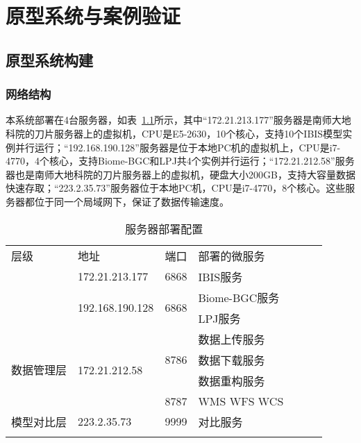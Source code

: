 \chapter{原型系统与案例验证}

\section{原型系统构建}
\subsection{网络结构}
本系统部署在4台服务器，如表~\ref{tab:server-cfg}所示，其中“172.21.213.177”服务器是南师大地科院的刀片服务器上的虚拟机，CPU是E5-2630，10个核心，支持10个IBIS模型实例并行运行；“192.168.190.128”服务器是位于本地PC机的虚拟机上，CPU是i7-4770，4个核心，支持Biome-BGC和LPJ共4个实例并行运行；“172.21.212.58”服务器也是南师大地科院的刀片服务器上的虚拟机，硬盘大小200GB，支持大容量数据快速存取；“223.2.35.73”服务器位于本地PC机，CPU是i7-4770，8个核心。这些服务器都位于同一个局域网下，保证了数据传输速度。

\begin{table}[H]
    \centering
    \caption{服务器部署配置}
    \label{tab:server-cfg}
    \begin{threeparttable}
        \begin{tabular}{lllllll}
            \Xhline{1.5pt}
            层级 & 地址 & 端口 & 部署的微服务 \\
            \Xhline{1pt}
            \multirow{3}{*}{模型计算层} & 172.21.213.177 & 6868 & IBIS服务 \\
            & \multirow{2}{*}{192.168.190.128} & \multirow{2}{*}{6868} & Biome-BGC服务 \\
            &&& LPJ服务 \\
            \hline
            \multirow{4}{*}{数据管理层} & \multirow{4}{*}{172.21.212.58} & \multirow{3}{*}{8786} & 数据上传服务 \\
            &&& 数据下载服务 \\
            &&& 数据重构服务 \\
            && 8787 & WMS WFS WCS \\
            \hline
            模型对比层 & 223.2.35.73 & 9999 & 对比服务 \\
            \Xhline{1.5pt}
        \end{tabular}
    \end{threeparttable}
\end{table}

